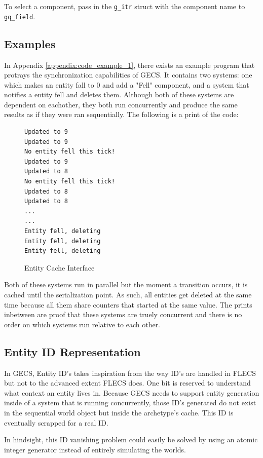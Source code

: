 To select a component, pass in the \texttt{g\_itr} struct with the component name to \texttt{gq\_field}. 

\subsection{Examples}
In Appendix \ref{appendix:code_example_1}, there exists an example program that protrays the synchronization capabilities of GECS. It contains two systems: one which makes an entity fall to 0 and add a "Fell" component, and a system that notifies a entity fell and deletes them. Although both of these systems are dependent on eachother, they both run concurrently and produce the same results as if they were ran sequentially. The following is a print of the code:

\begin{figure}[H]
    \begin{verbatim}
Updated to 9
Updated to 9
No entity fell this tick!                            
Updated to 9
Updated to 8
No entity fell this tick!                            
Updated to 8
Updated to 8
...
...
Entity fell, deleting
Entity fell, deleting
Entity fell, deleting
\end{verbatim}
\caption{Entity Cache Interface}
\label{code:component_retrieval}
\end{figure}

Both of these systems run in parallel but the moment a transition occurs, it is cached until the serialization point. As such, all entities get deleted at the same time because all them share counters that started at the same value. The prints inbetween are proof that these systems are truely concurrent and there is no order on which systems run relative to each other.

\subsection{Entity ID Representation}
In GECS, Entity ID's takes inspiration from the way ID's are handled in FLECS but not to the advanced extent FLECS does. One bit is reserved to understand what context an entity lives in. Because GECS needs to support entity generation inside of a system that is running concurrently, those ID's generated do not exist in the sequential world object but inside the archetype's cache. This ID is eventually scrapped for a real ID. 

In hindsight, this ID vanishing problem could easily be solved by using an atomic integer generator instead of entirely simulating the worlds. 


